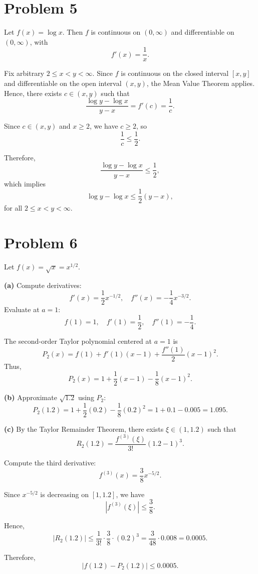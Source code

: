 \documentclass[12pt]{article}
\begin{document}
\section*{Problem 5}
Let \( f(x) = \log x \). Then \( f \) is continuous on \( (0,\infty) \) and differentiable on \( (0,\infty) \), with
\[
	f'(x) = \frac{1}{x}.
\]

Fix arbitrary \( 2 \le x < y < \infty \). Since \( f \) is continuous on the closed interval \( [x,y] \) and differentiable on the open interval \( (x,y) \), the Mean Value Theorem applies. Hence, there exists \( c \in (x,y) \) such that
\[
	\frac{\log y - \log x}{y - x} = f'(c) = \frac{1}{c}.
\]

Since \( c \in (x,y) \) and \( x \ge 2 \), we have \( c \ge 2 \), so
\[
	\frac{1}{c} \le \frac{1}{2}.
\]

Therefore,
\[
	\frac{\log y - \log x}{y - x} \le \frac{1}{2},
\]
which implies
\[
	\log y - \log x \le \frac{1}{2}(y - x),
\]
for all \( 2 \le x < y < \infty \).

\section*{Problem 6}
Let \( f(x) = \sqrt{x} = x^{1/2} \).

\textbf{(a)} Compute derivatives:
\[
	f'(x) = \frac{1}{2}x^{-1/2}, \quad f''(x) = -\frac{1}{4}x^{-3/2}.
\]
Evaluate at \( a=1 \):
\[
	f(1)=1, \quad f'(1)=\frac{1}{2}, \quad f''(1)=-\frac{1}{4}.
\]

The second-order Taylor polynomial centered at \( a=1 \) is
\[
	P_2(x) = f(1) + f'(1)(x-1) + \frac{f''(1)}{2}(x-1)^2.
\]
Thus,
\[
	P_2(x) = 1 + \frac{1}{2}(x-1) - \frac{1}{8}(x-1)^2.
\]

\textbf{(b)} Approximate \( \sqrt{1.2} \) using \( P_2 \):
\[
	P_2(1.2) = 1 + \frac{1}{2}(0.2) - \frac{1}{8}(0.2)^2
	= 1 + 0.1 - 0.005 = 1.095.
\]

\textbf{(c)} By the Taylor Remainder Theorem, there exists \( \xi \in (1,1.2) \) such that
\[
	R_2(1.2) = \frac{f^{(3)}(\xi)}{3!}(1.2-1)^3.
\]

Compute the third derivative:
\[
	f^{(3)}(x) = \frac{3}{8}x^{-5/2}.
\]

Since \( x^{-5/2} \) is decreasing on \( [1,1.2] \), we have
\[
	|f^{(3)}(\xi)| \le \frac{3}{8}.
\]

Hence,
\[
	|R_2(1.2)| \le \frac{1}{3!}\cdot \frac{3}{8} \cdot (0.2)^3
	= \frac{3}{48} \cdot 0.008
	= 0.0005.
\]

Therefore,
\[
	|f(1.2) - P_2(1.2)| \le 0.0005.
\]
\end{document}
